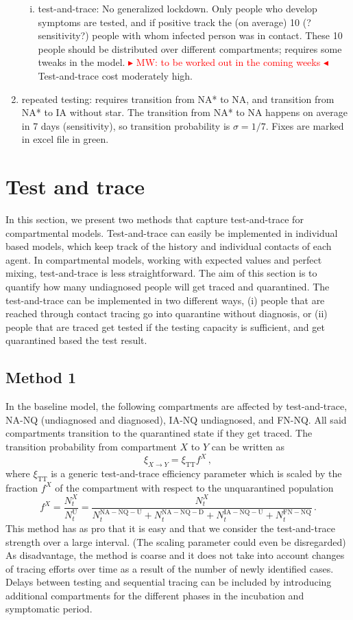 \documentclass{article}
\newcommand{\be}{\begin{equation}}
\newcommand{\ee}{\end{equation}}
\newcommand{\mynote}[1]{\noindent \textcolor{red} {{$\blacktriangleright$
   \small{\textsf{#1}} $\blacktriangleleft$}}}
\begin{document}
\begin{enumerate}[-]
\begin{enumerate}[i.]
\item test-and-trace: No generalized lockdown. Only people who develop symptoms are tested, and if positive track the (on average) 10 (?sensitivity?) people with whom infected person was in contact. These 10 people should be distributed over different compartments; requires some tweaks in the model.  \mynote{MW: to be worked out in the coming weeks} Test-and-trace cost moderately high. 
\end{enumerate}
\item repeated testing: requires transition from NA* to NA, and transition from NA* to IA without star. The transition from NA* to NA happens on average in 7 days (sensitivity), so transition probability is $\sigma = 1/7$. Fixes are marked in excel file in green. 
\end{enumerate}

\section{Test and trace}
In this section, we present two methods that capture test-and-trace for compartmental models. Test-and-trace can easily be implemented in individual based models, which keep track of the history and individual contacts of each agent. In compartmental models, working with expected values and perfect mixing, test-and-trace is less straightforward. The aim of this section is to quantify how many undiagnosed people will get traced and quarantined. The test-and-trace can be implemented in two different ways, (i) people that are reached through contact tracing go into quarantine without diagnosis, or (ii) people that are traced get tested if the testing capacity is sufficient, and get quarantined based the test result. 

\subsection{Method 1}
In the baseline model, the following compartments are affected by test-and-trace, NA-NQ (undiagnosed and diagnosed), IA-NQ undiagnosed, and FN-NQ. All said compartments transition to the quarantined state if they get traced. The transition probability from compartment $X$ to $Y$ can be written as
\be
\xi_{X \to Y} = \xi_\mathrm{TT} f^X \, , 
\ee 
where $\xi_\mathrm{TT}$ is a generic test-and-trace efficiency parameter which is scaled by the fraction $f^X$ of the compartment with respect to the unquarantined population 
\be
f^X = \frac{N_t^X}{N_t^\mathrm{U}} = \frac{N_t^X}{N_t^\mathrm{NA-NQ-U}+N_t^\mathrm{NA-NQ-D} + N_t^\mathrm{IA-NQ-U} + N_t^\mathrm{FN-NQ}} \, .
\ee
This method has as pro that it is easy and that we consider the test-and-trace strength over a large interval. (The scaling parameter could even be disregarded) As disadvantage, the method is coarse and it does not take into account changes of tracing efforts over time as a result of the number of newly identified cases. Delays between testing and sequential tracing can be included by introducing additional compartments for the different phases in the incubation and symptomatic period. 
\end{document}
